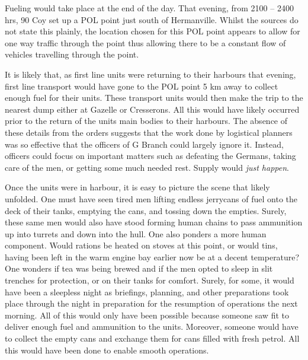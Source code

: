 \documentclass[noraggedright]{turabian-researchpaper}
\begin{document}
Fueling would take place at the end of the day.  That evening, from 2100 -- 
2400 hrs, 90 Coy set up a POL point just south of Hermanville.\autocite
[8 July 1944] {90wd} Whilst the sources do not state this plainly, the 
location chosen for this POL point appears to allow for one way traffic 
through the point thus allowing there to be a constant flow of vehicles 
travelling through the point.

It is likely that, as first line units were returning to their harbours that 
evening, first line transport would have gone to the POL point 5 km away 
to collect enough fuel for their units.  These transport units would then 
make the trip to the nearest dump either at Gazelle or Cresserons.  All this 
would have likely occurred prior to the return of the units main bodies to 
their harbours.  The absence of these details from the orders suggests that 
the work done by logistical planners was so effective that the officers of G 
Branch could largely ignore it.  Instead, officers could focus on important 
matters such as defeating the Germans, taking care of the men, or getting 
some much needed rest.  Supply would \textit{just happen}.


Once the units were in harbour, it is easy to picture the scene that likely 
unfolded. One must have seen tired men lifting endless jerrycans of fuel onto 
the deck of their tanks, emptying the cans, and tossing down the empties.  
Surely, these same men would also have  stood forming human chains to pass 
ammunition up into turrets and down into the hull.  One also ponders a more 
human component.  Would rations be heated on stoves at this point, or would 
tins, having been left in the warm engine bay earlier now be at a decent 
temperature?  One wonders if tea was being brewed and if the men opted to 
sleep in slit trenches for protection, or on their tanks for comfort.  Surely,
for some, it would have been a sleepless night as briefings, planning, and 
other preparations took place through the night in  preparation for the 
resumption of operations the next morning.  All of this would only have been 
possible because someone saw fit to deliver enough fuel and ammunition to the 
units.  Moreover, someone would have to collect the empty cans and exchange 
them for cans filled with fresh petrol.  All this would have been done to 
enable smooth operations.  
\end{document}
